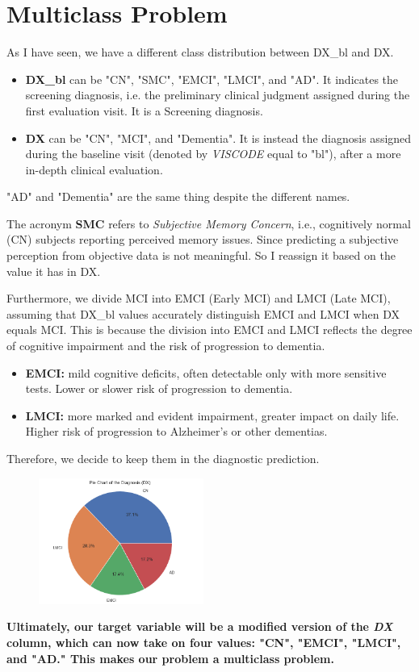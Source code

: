 \section{Multiclass Problem}
As I have seen, we have a different class distribution between DX\_bl and DX.
\begin{itemize}
	\item \textbf{DX\_bl} can be "CN", "SMC", "EMCI", "LMCI", and "AD". It indicates the screening diagnosis, i.e. the preliminary clinical judgment assigned during the first evaluation visit. It is a Screening diagnosis.
	\item \textbf{DX} can be "CN", "MCI", and "Dementia". It is instead the diagnosis assigned during the baseline visit (denoted by \textit{VISCODE} equal to "bl"), after a more in-depth clinical evaluation. 
\end{itemize}
"AD" and "Dementia" are the same thing despite the different names.

The acronym \textbf{SMC} refers to \textit{Subjective Memory Concern}, i.e., cognitively normal (CN) subjects reporting perceived memory issues. Since predicting a subjective perception from objective data is not meaningful. So I reassign it based on the value it has in DX.

\vspace{2mm}

Furthermore, we divide MCI into EMCI (Early MCI) and LMCI (Late MCI), assuming that DX\_bl values accurately distinguish EMCI and LMCI when DX equals MCI. This is because the division into EMCI and LMCI reflects the degree of cognitive impairment and the risk of progression to dementia.
\begin{itemize}
	\item \textbf{EMCI:} mild cognitive deficits, often detectable only with more sensitive tests. Lower or slower risk of progression to dementia.
	\item \textbf{LMCI:} more marked and evident impairment, greater impact on daily life. Higher risk of progression to Alzheimer's or other dementias.
\end{itemize}
Therefore, we decide to keep them in the diagnostic prediction.

\begin{figure}[H]
	\centering
	\includegraphics[width=0.48\textwidth]{images/DX_pie_chart.png}
	\label{fig:pie-chart-dx}
\end{figure}

\textbf{Ultimately, our target variable will be a modified version of the \textit{DX} column, which can now take on four values: "CN", "EMCI", "LMCI", and "AD." This makes our problem a multiclass problem.}

\newpage